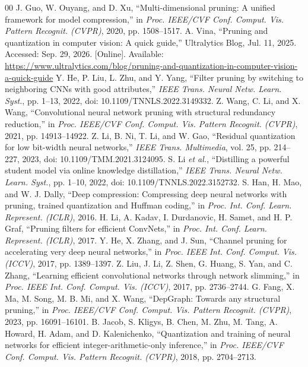 \documentclass[conference]{IEEEtran}
\begin{document}
\begin{thebibliography}{00}
 J. Guo, W. Ouyang, and D. Xu, ``Multi-dimensional pruning: A unified framework for model compression,'' in \emph{Proc. IEEE/CVF Conf. Comput. Vis. Pattern Recognit. (CVPR)}, 2020, pp. 1508--1517.
 A. Vina, ``Pruning and quantization in computer vision: A quick guide,'' Ultralytics Blog, Jul. 11, 2025. Accessed: Sep. 29, 2026. [Online]. Available: \url{https://www.ultralytics.com/blog/pruning-and-quantization-in-computer-vision-a-quick-guide}
 Y. He, P. Liu, L. Zhu, and Y. Yang, ``Filter pruning by switching to neighboring CNNs with good attributes,'' \emph{IEEE Trans. Neural Netw. Learn. Syst.}, pp. 1--13, 2022, doi: 10.1109/TNNLS.2022.3149332.
 Z. Wang, C. Li, and X. Wang, ``Convolutional neural network pruning with structural redundancy reduction,'' in \emph{Proc. IEEE/CVF Conf. Comput. Vis. Pattern Recognit. (CVPR)}, 2021, pp. 14913--14922.
 Z. Li, B. Ni, T. Li, and W. Gao, ``Residual quantization for low bit-width neural networks,'' \emph{IEEE Trans. Multimedia}, vol. 25, pp. 214--227, 2023, doi: 10.1109/TMM.2021.3124095.
 S. Li \emph{et al.}, ``Distilling a powerful student model via online knowledge distillation,'' \emph{IEEE Trans. Neural Netw. Learn. Syst.}, pp. 1--10, 2022, doi: 10.1109/TNNLS.2022.3152732.
 S. Han, H. Mao, and W. J. Dally, ``Deep compression: Compressing deep neural networks with pruning, trained quantization and Huffman coding,'' in \emph{Proc. Int. Conf. Learn. Represent. (ICLR)}, 2016.
 H. Li, A. Kadav, I. Durdanovic, H. Samet, and H. P. Graf, ``Pruning filters for efficient ConvNets,'' in \emph{Proc. Int. Conf. Learn. Represent. (ICLR)}, 2017.
 Y. He, X. Zhang, and J. Sun, ``Channel pruning for accelerating very deep neural networks,'' in \emph{Proc. IEEE Int. Conf. Comput. Vis. (ICCV)}, 2017, pp. 1389--1397.
 Z. Liu, J. Li, Z. Shen, G. Huang, S. Yan, and C. Zhang, ``Learning efficient convolutional networks through network slimming,'' in \emph{Proc. IEEE Int. Conf. Comput. Vis. (ICCV)}, 2017, pp. 2736--2744.
 G. Fang, X. Ma, M. Song, M. B. Mi, and X. Wang, ``DepGraph: Towards any structural pruning,'' in \emph{Proc. IEEE/CVF Conf. Comput. Vis. Pattern Recognit. (CVPR)}, 2023, pp. 16091--16101.
 B. Jacob, S. Kligys, B. Chen, M. Zhu, M. Tang, A. Howard, H. Adam, and D. Kalenichenko, ``Quantization and training of neural networks for efficient integer-arithmetic-only inference,'' in \emph{Proc. IEEE/CVF Conf. Comput. Vis. Pattern Recognit. (CVPR)}, 2018, pp. 2704--2713.

\end{thebibliography}
\end{document}
